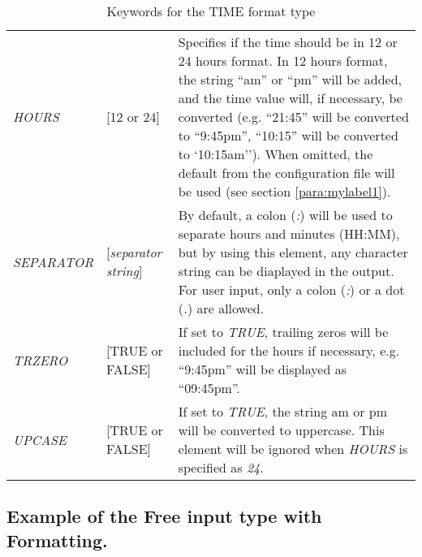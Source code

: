 \documentclass[a4paper]{book}
\begin{document}
\begin{table}[ht]
\begin{minipage}[t]{\textwidth}
\begin{tabular}{llp{6cm}} \hline
\textsl{HOURS} & [\textsf{12} or \textsf{24}] &  Specifies if the time should be in 12 or 24 hours format. In 
12 hours format, the string ``am'' or ``pm'' will be added, and the time 
value will, if necessary, be converted (e.g. ``21:45'' will be converted 
to ``9:45pm'', ``10:15'' will be converted to `10:15am''). \linebreak
When omitted, the default from the configuration file will be 
used (see section \ref{para:mylabel1}).\\
\textsl{SEPARATOR} & [\textit{separator string}] & By default, a colon (\textsl{:}) will be used to separate hours and minutes 
(HH:MM), but by using this element, any character string can 
be diaplayed in the output. For user input, only a colon (\textsl{:}) or a dot (\textsl{.}) are allowed. \\
\textsl{TRZERO} & [\textsf{TRUE} or \textsf{FALSE}] & If set to \textsl{TRUE}, trailing zeros will be included for the hours 
if necessary, e.g. ``9:45pm'' will be displayed as ``09:45pm''.\\
\textsl{UPCASE} & [\textsf{TRUE} or \textsf{FALSE}] &  If set to \textsl{TRUE}, the string am or pm will be converted to uppercase. 
This element will be ignored when \textsl{HOURS} is specified as \textsl{24}. \\ \hline
\end{tabular}
\caption{Keywords for the TIME format type}\label{tab:time}
\end{minipage}
\end{table}

\subsection{Example of the Free input type with Formatting.}\label{subsubsec:mylabel38}
\end{document}
